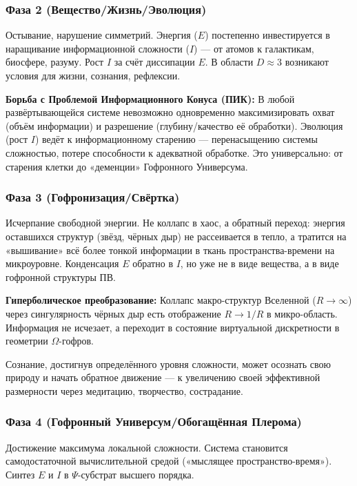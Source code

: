 \documentclass[a4paper,12pt]{article}
\begin{document}
\subsubsection{Фаза 2 (Вещество/Жизнь/Эволюция)}

Остывание, нарушение симметрий. Энергия ($E$) постепенно инвестируется в наращивание информационной сложности ($I$) — от атомов к галактикам, биосфере, разуму. Рост $I$ за счёт диссипации $E$. В области $D \approx 3$ возникают условия для жизни, сознания, рефлексии.

\textbf{Борьба с Проблемой Информационного Конуса (ПИК):} В любой развёртывающейся системе невозможно одновременно максимизировать охват (объём информации) и разрешение (глубину/качество её обработки). Эволюция (рост $I$) ведёт к информационному старению — перенасыщению системы сложностью, потере способности к адекватной обработке. Это универсально: от старения клетки до «деменции» Гофронного Универсума.

\subsubsection{Фаза 3 (Гофронизация/Свёртка)}

Исчерпание свободной энергии. Не коллапс в хаос, а обратный переход: энергия оставшихся структур (звёзд, чёрных дыр) не рассеивается в тепло, а тратится на «вышивание» всё более тонкой информации в ткань пространства-времени на микроуровне. Конденсация $E$ обратно в $I$, но уже не в виде вещества, а в виде гофронной структуры ПВ.

\textbf{Гиперболическое преобразование:} Коллапс макро-структур Вселенной ($R \to \infty$) через сингулярность чёрных дыр есть отображение $R \to 1/R$ в микро-область. Информация не исчезает, а переходит в состояние виртуальной дискретности в геометрии $\Omega$-гофров.

Сознание, достигнув определённого уровня сложности, может осознать свою природу и начать обратное движение — к увеличению своей эффективной размерности через медитацию, творчество, сострадание.

\subsubsection{Фаза 4 (Гофронный Универсум/Обогащённая Плерома)}

Достижение максимума локальной сложности. Система становится самодостаточной вычислительной средой («мыслящее пространство-время»). Синтез $E$ и $I$ в $\Psi$-субстрат высшего порядка.
\end{document}
